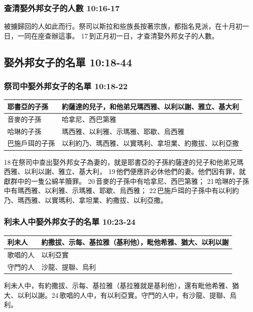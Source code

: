 \subsubsection{查清娶外邦女子的人數 10:16-17}
被擄歸回的人如此而行。祭司以斯拉和些族長按著宗族，都指名見派，在十月初一日，一同在座查辦這事。 17 到正月初一日，才查清娶外邦女子的人數。






\subsection{娶外邦女子的名單 10:18-44}
\subsubsection{祭司中娶外邦女子的名單 10:18-22}
\begin{table}[H]
\centering 
\begin{tabular}{p{3cm}|p{10cm}}\hline\hline
耶書亞的子孫& 約薩達的兒子，和他弟兄瑪西雅、以利以謝、雅立、基大利 \\\hline
音麥的子孫 &哈拿尼、西巴第雅 \\\hline
哈琳的子孫&瑪西雅、以利雅、示瑪雅、耶歇、烏西雅\\\hline
巴施戶珥的子孫&以利約乃、瑪西雅、以實瑪利、拿坦業、約撒拔、以利亞撒\\\hline
\end{tabular}
\end{table}

18 在祭司中查出娶外邦女子為妻的，就是耶書亞的子孫約薩達的兒子和他弟兄瑪西雅、以利以謝、雅立、基大利， 19 他們便應許必休他們的妻。他們因有罪，就獻群中的一隻公綿羊贖罪。 20 音麥的子孫中有哈拿尼、西巴第雅； 21 哈琳的子孫中有瑪西雅、以利雅、示瑪雅、耶歇、烏西雅； 22 巴施戶珥的子孫中有以利約乃、瑪西雅、以實瑪利、拿坦業、約撒拔、以利亞撒。


\subsubsection{利未人中娶外邦女子的名單 10:23-24}
\begin{table}
\centering 
\begin{tabular}{p{1.9cm}|p{}}\hline\hline
 利未人 & 約撒拔、示每、基拉雅（基利他），毗他希雅、猶大、以利以謝 \\\hline
歌唱的人  &以利亞實 \\\hline
守門的人  &沙龍、提聯、烏利 \\\hline
\end{tabular}
\end{table}
利未人中，有約撒拔、示每、基拉雅（基拉雅就是基利他），還有毗他希雅、猶大、以利以謝。24 歌唱的人中，有以利亞實。守門的人中，有沙龍、提聯、烏利。


